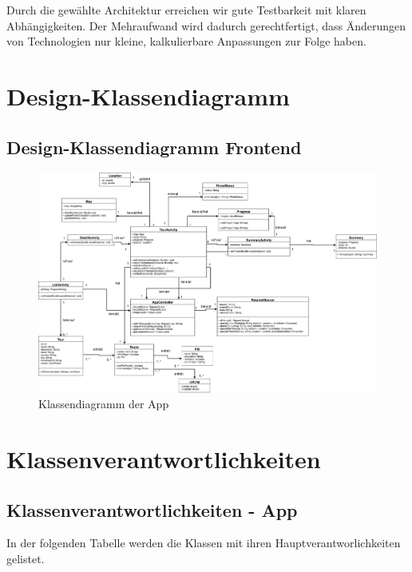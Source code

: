 \documentclass[a4paper,10pt,xetex]{article}
\begin{document}
Durch die gewählte Architektur erreichen wir gute Testbarkeit mit klaren
Abhängigkeiten. Der Mehraufwand wird dadurch gerechtfertigt, dass Änderungen
von Technologien nur kleine, kalkulierbare Anpassungen zur Folge haben.

\section{Design-Klassendiagramm}\label{design-klassendiagram}
\subsection{Design-Klassendiagramm Frontend}\label{design-klassendiagram-frontend}
\begin{figure}
  \includegraphics{classdiagram_frontend}
  \caption{Klassendiagramm der App}
\end{figure}

\section{Klassenverantwortlichkeiten}\label{klassenverantwortlichkeiten}
\subsection{Klassenverantwortlichkeiten - App}\label{klassenverantwortlichkeiten-frontend}
In der folgenden Tabelle werden die Klassen mit ihren Hauptverantworlichkeiten
gelistet.
\end{document}
